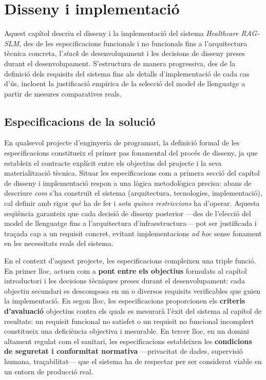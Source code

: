 \documentclass[CAT]{TFUOC}%
\begin{document}

\chapter{Disseny i implementació}

Aquest capítol descriu el disseny i la implementació del sistema \textit{Healthcare RAG-SLM}, des de les especificacions funcionals i no funcionals fins a l'arquitectura tècnica concreta, l'\textit{stack} de desenvolupament i les decisions de disseny preses durant el desenvolupament. S'estructura de manera progressiva, des de la definició dels requisits del sistema fins als detalls d'implementació de cada cas d'ús, incloent la justificació empírica de la selecció del model de llenguatge a partir de mesures comparatives reals.

\section{Especificacions de la solució}

En qualsevol projecte d'enginyeria de programari, la definició formal de les especificacions constitueix el primer pas fonamental del procés de disseny, ja que estableix el contracte explícit entre els objectius del projecte i la seva materialització tècnica. Situar les especificacions com a primera secció del capítol de disseny i implementació respon a una lògica metodològica precisa: abans de descriure \textit{com} s'ha construït el sistema (arquitectura, tecnologies, implementació), cal definir amb rigor \textit{què} ha de fer i \textit{sota quines restriccions} ha d'operar. Aquesta seqüència garanteix que cada decisió de disseny posterior ---des de l'elecció del model de llenguatge fins a l'arquitectura d'infraestructura--- pot ser justificada i traçada cap a un requisit concret, evitant implementacions \textit{ad hoc} sense fonament en les necessitats reals del sistema.

En el context d'aquest projecte, les especificacions compleixen una triple funció. En primer lloc, actuen com a \textbf{pont entre els objectius} formulats al capítol introductori i les decisions tècniques preses durant el desenvolupament: cada objectiu secundari es descomposa en un o diversos requisits verificables que guien la implementació. En segon lloc, les especificacions proporcionen els \textbf{criteris d'avaluació} objectius contra els quals es mesurarà l'èxit del sistema al capítol de resultats: un requisit funcional no satisfet o un requisit no funcional incomplert constitueix una deficiència objectiva i mesurable. En tercer lloc, en un domini altament regulat com el sanitari, les especificacions estableixen les \textbf{condicions de seguretat i conformitat normativa} ---privacitat de dades, supervisió humana, traçabilitat--- que el sistema ha de respectar per ser considerat viable en un entorn de producció real.
\end{document}
